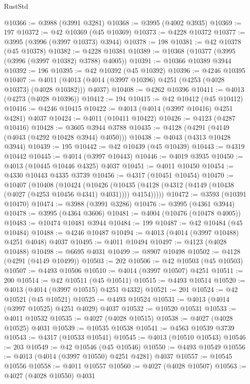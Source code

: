 \begin{lexlean}{RustStd}
\begin{coremodule}
@10366 := @3988 (@3991 @3281)
@10368 := @3995 (@4002 @3935)
@10369 := 197
@10372 := @42 @10369 (@45 @10369)
@10373 := @4228 @10372
@10377 := @3995 (@3996 (@3997 @10373) @3944)
@10378 := 198
@10381 := @42 @10378 (@45 @10378)
@10382 := @4228 @10381
@10389 := @10368 (@10377 (@3995 (@3996 (@3997 @10382) @3788) @4005))
@10391 := @10366 @10389 @3944
@10392 := 196
@10395 := @42 @10392 (@45 @10392)
@10396 := @4246 @10395
@10407 := @4011 (@4013 (@4014 (@3997 @10396) @4251 (@4253 (@4028 @10373) (@4028 @10382))) @4037)
@10408 := @4262 @10396
@10411 := @4013 (@4273 (@4028 @10396))
@10412 := 194
@10415 := @42 @10412 (@45 @10412)
@10416 := @4246 @10415
@10422 := @4013 (@4014 (@3997 @10416) @4251 @4281) @4037
@10424 := @4011 (@10411 @10422)
@10426 := @4123 (@4287 @10416)
@10428 := @3605 @3944 @3788
@10435 := @4128 (@4291 (@4149 (@4043 (@4292 @10428 @3944) @4050)))
@10438 := @4043 (@4313 @10428 @3944)
@10439 := 195
@10442 := @42 @10439 (@45 @10439)
@10443 := @4319 @10442
@10445 := @4014 (@3997 @10443)
@10446 := @4019 @3935
@10450 := @4013 (@10445 @10446 @4325) @4037
@10451 := @4011 @10450
@10454 := @4330 @10443 @4335 @3739
@10456 := @4317 (@10451 @10454)
@10470 := @10407
    (@10408
      (@10424
        (@10426
          (@10435 (@4128 (@4312 (@4149 (@10438 (@4027 (@4253 @10456 @4341) @4031)))) @4154)))))
@10472 := @3593 (@10391 @10470)
@10474 := @3988 (@3991 @3286)
@10476 := @3995 (@4361 @3944)
@10478 := @3995 (@4364 @3606)
@10481 := @4004 (@10476 (@10478 @4005))
@10483 := @10474 @10481 @3944
@10484 := 199
@10487 := @42 @10484 (@45 @10484)
@10488 := @4246 @10487
@10494 := @4013 (@4014 (@3997 @10488) @4251 @4048) @4037
@10495 := @4011 @10494
@10497 := @4123 (@4028 @10488)
@10498 := @6695 @4031
@10499 := @8907 @10498
@10502 := @4128 (@4291 (@4149 @10499))
@10503 := 202
@10506 := @42 @10503 (@45 @10503)
@10507 := @4493 @10506
@10510 := @4014 (@3997 @10507) @4251
@10511 := 200
@10514 := @42 @10511 (@45 @10511)
@10515 := @4493 @10514
@10520 := @4013 (@4014 (@3997 @10515) @4251 @4332)
@10521 := 201
@10524 := @42 @10521 (@45 @10521)
@10525 := @4493 @10524
@10531 := @4013 (@4014 (@3997 @10525) @4251 @4029) @4037
@10532 := @10520 @10531
@10533 := @4011 @10532
@10535 := @4027 (@4028 @10515)
@10538 := @4027 (@4028 @10525) @4031
@10539 := @10535 @10538
@10541 := @4563 @10539 @3739
@10543 := @4317 (@10533 @10541)
@10545 := @4013 (@10510 @10543)
@10546 := 203
@10549 := @42 @10546 (@45 @10546)
@10550 := @4493 @10549
@10556 := @4013 (@4014 (@3997 @10550) @4251 @4281) @4037
@10557 := @10545 @10556
@10558 := @4011 @10557
@10560 := @4027 (@4028 @10507)
@10563 := @4027 (@4028 @10550) @4031

\end{coremodule}
\end{lexlean}
